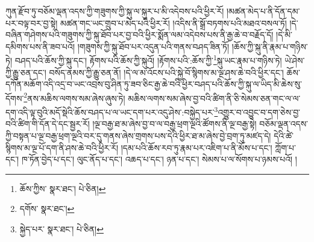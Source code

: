 ཀུན་རྫོབ་ཏུ་བཅོམ་ལྡན་འདས་ཀྱི་གཟུགས་ཀྱི་སྐུ་ལ་སྐུར་པ་མི་འདེབས་པའི་ཕྱིར་རོ། །མཚན་མེད་པ་ནི་དོན་དམ་པར་བལྟ་བར་བྱ་སྟེ། མཚན་གང་ཡང་གྲུབ་པ་མེད་པའི་ཕྱིར་རོ། །འདིས་ནི་སྒྲོ་བཏགས་པའི་མཐའ་བསལ་ཏོ། །དེ་བཞིན་གཤེགས་པའི་གཟུགས་ཀྱི་སྐུ་ཐོབ་པར་བྱ་བའི་ཕྱིར་སྨོན་ལམ་འདེབས་པས་ནི་རྒྱ་ཆེ་བ་བརྗོད་དོ། །དེ་མི་དམིགས་པས་ནི་ཟབ་པའོ། །གཟུགས་ཀྱི་སྐུ་ཐོབ་པར་འདུན་པའི་གནས་བཤད་ཟིན་ཏོ། །ཆོས་ཀྱི་སྐུ་ནི་རྣམ་པ་གཉིས་ཏེ། བཤད་པའི་ཆོས་ཀྱི་སྐུ་དང་། རྟོགས་པའི་ཆོས་ཀྱི་སྐུའོ། །རྟོགས་པའི་:ཆོས་ཀྱི་\footnote{ཆོས་ཀྱིས་  སྣར་ཐང་།  པེ་ཅིན། }སྐུ་ཡང་རྣམ་པ་གཉིས་ཏེ། ཡེ་ཤེས་ཀྱི་རྒྱུ་ཅན་དང་། བསོད་ནམས་ཀྱི་རྒྱུ་ཅན་ནོ། །དེ་ལ་མ་འོངས་པའི་སྐྱེ་བོ་སྙིགས་མ་ལྔ་ཤས་ཆེ་བའི་ཕྱིར་དང་། ཆོས་དཀོན་མཆོག་འདི་འདྲ་བ་ཡང་འབྲས་བུ་ཤིན་ཏུ་ཟབ་ཅིང་རྒྱ་ཆེ་བའི་ཕྱིར་བཤད་པའི་ཆོས་ཀྱི་སྐུ་ལ་ཡིད་མི་ཆེས་སུ་དོགས་\footnote{དགོས་  སྣར་ཐང་། }ནས་མཆིས་ལགས་སམ་ཞེས་ཞུས་ཏེ། མཆིས་ལགས་སམ་ཞེས་བྱ་བའི་ཚིག་ནི་ཅི་སེམས་ཅན་གང་ལ་ལ་དག་འདི་ལྟ་བུའི་མདོ་སྡེའི་ཆོས་བཤད་པ་ལ་ཡང་དག་པར་འདུ་ཤེས་:བསྐྱེད་པར་\footnote{སྐྱེད་པར་  སྣར་ཐང་།  པེ་ཅིན། }འགྱུར་བ་འབྱུང་བ་དག་ཅེས་བྱ་བའི་ཚིག་གི་དོན་དེ་དང་སྦྱར་རོ། །ལྔ་བརྒྱ་ཐ་མ་ཞེས་བྱ་བ་ལ་བརྒྱ་ཕྲག་ལྔའི་ཚོགས་ནི་ལྔ་བརྒྱ་སྟེ། བཅོམ་ལྡན་འདས་ཀྱི་བསྟན་པ་ལྔ་བརྒྱ་ཕྲག་ལྔའི་བར་དུ་གནས་ཞེས་གྲགས་པས་དེའི་ཕྱིར་ཐ་མ་ཞེས་བྱེ་བྲག་ཏུ་མཛད་དེ། དེའི་ཚེ་སྙིགས་མ་ལྔ་པོ་དག་ནི་ཤས་ཆེ་བའི་ཕྱིར་རོ། །དམ་པའི་ཆོས་རབ་ཏུ་རྣམ་པར་འཇིག་པ་ནི་མོས་པ་དང་། ཀློག་པ་དང་། ཁ་ཏོན་བྱེད་པ་དང་། ལུང་ནོད་པ་དང་། འཆད་པ་དང་། ཉན་པ་དང་། སེམས་པ་ལ་སོགས་པ་ཉམས་པའོ། །
